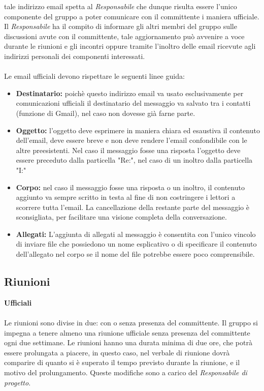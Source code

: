 \documentclass[a4paper]{report}
\begin{document}
	tale indirizzo email spetta al \emph{Responsabile} che dunque risulta essere l'unico componente del gruppo a poter comunicare
	con il committente i maniera ufficiale. Il \emph{Responsabile} ha il compito di informare gli altri membri del gruppo sulle 
	discussioni avute con il committente, tale aggiornamento può avvenire a voce durante le riunioni e gli incontri oppure tramite
	l'inoltro delle email ricevute agli indirizzi personali dei componenti interessati.
	\\ \\
	Le email ufficiali devono rispettare le seguenti linee guida:
	\begin{itemize}
		\item \textbf{Destinatario:} poichè questo indirizzo email va usato esclusivamente per comunicazioni ufficiali il destinatario
		del messaggio va salvato tra i contatti (funzione di Gmail), nel caso non dovesse già farne parte.
		\item \textbf{Oggetto:} l'oggetto deve esprimere in maniera chiara ed esaustiva il contenuto dell'email, deve essere breve
		 e non deve rendere l'email confondibile con le altre preesistenti. 
		 Nel caso il messaggio fosse una risposta l'oggetto deve essere preceduto dalla particella "Re:", nel caso di un inoltro dalla
		 particella "I:"
		\item \textbf{Corpo:} nel caso il messaggio fosse una risposta o un inoltro, il contenuto aggiunto va sempre scritto in testa al
		fine di non costringere i lettori a scorrere tutta l'email. La cancellazione della restante parte del messaggio è sconsigliata, per
		facilitare una visione completa della conversazione.
		\item \textbf{Allegati:} L'aggiunta di allegati al messaggio è consentita con l'unico vincolo di inviare file che possiedono un nome
		esplicativo o di specificare il contenuto dell'allegato nel corpo se il nome del file potrebbe essere poco comprensibile.
	\end{itemize}										
	\subsection{Riunioni}
	\textbf{Ufficiali} \\ \\
		Le riunioni sono divise in due: con o senza presenza del committente. Il gruppo si impegna a tenere almeno una riunione
		ufficiale senza presenza del committente ogni due settimane. Le riunioni hanno una durata minima di due ore, che potrà 
		essere prolungata a piacere, in questo caso, nel verbale di riunione dovrà comparire di quanto si è superato il tempo
		previsto durante la riunione, e il motivo del prolungamento. Queste modifiche sono a carico del \emph{Responsabile di progetto}.
		
\end{document}
